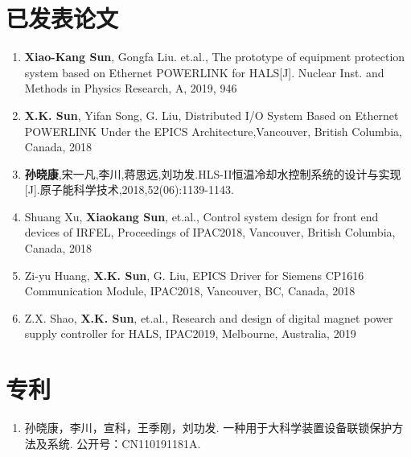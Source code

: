 
\begin{publications}

\section*{已发表论文}

\begin{enumerate}
    \item {\textbf{Xiao-Kang Sun}, Gongfa Liu. et.al., The prototype of equipment protection system based on Ethernet POWERLINK for HALS[J]. Nuclear Inst. and Methods in Physics Research, A, 2019, 946}
    \item{\textbf{X.K. Sun}, Yifan Song, G. Liu, Distributed I/O System Based on Ethernet POWERLINK Under the EPICS Architecture,Vancouver, British Columbia, Canada, 2018}
    \item \textbf{孙晓康},宋一凡,李川,蒋思远,刘功发.HLS-II恒温冷却水控制系统的设计与实现[J].原子能科学技术,2018,52(06):1139-1143.
    \item {Shuang Xu, \textbf{Xiaokang Sun}, et.al., Control system design for front end devices of IRFEL, Proceedings of IPAC2018, Vancouver, British Columbia, Canada, 2018}
    \item {Zi-yu Huang, \textbf{X.K. Sun}, G. Liu, EPICS Driver for Siemens CP1616 Communication Module, IPAC2018, Vancouver, BC, Canada, 2018}
    \item {Z.X. Shao, \textbf{X.K. Sun}, et.al., Research and design of digital magnet power supply controller for HALS, IPAC2019, Melbourne, Australia, 2019}
\end{enumerate}




\section*{专利}
\begin{enumerate}
\item 孙晓康，李川，宣科，王季刚，刘功发. 一种用于大科学装置设备联锁保护方法及系统. 公开号：CN110191181A.
\end{enumerate}


\end{publications}
